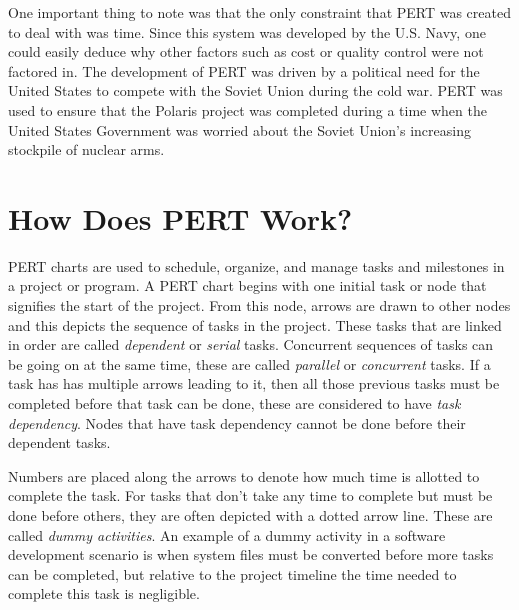 \documentclass[12pt]{article}
\begin{document}
One important thing to note was that the only constraint that PERT was created to deal with was time.
Since this system was developed by the U.S. Navy, one could easily deduce why other factors such as cost or quality control were not factored in.
The development of PERT was driven by a political need for the United States to compete with the Soviet Union during the cold war.
PERT was used to ensure that the Polaris project was completed during a time when the United States Government was worried about the Soviet Union's increasing stockpile of nuclear arms.
\section{How Does PERT Work?}
PERT charts are used to schedule, organize, and manage tasks and milestones in a project or program.
A PERT chart begins with one initial task or node that signifies the start of the project.
From this node, arrows are drawn to other nodes and this depicts the sequence of tasks in the project.  These tasks that are linked in order are called \textit{dependent} or \textit{serial} tasks.
Concurrent sequences of tasks can be going on at the same time, these are called \textit{parallel} or \textit{concurrent} tasks.
If a task has has multiple arrows leading to it, then all those previous tasks must be completed before that task can be done, these are considered to have \textit{task dependency}.  Nodes that have task dependency cannot be done before their dependent tasks.

Numbers are placed along the arrows to denote how much time is allotted to complete the task.
For tasks that don't take any time to complete but must be done before others, they are often depicted with a dotted arrow line.  These are called \textit{dummy activities}.
An example of a dummy activity in a software development scenario is when system files must be converted before more tasks can be completed, but relative to the project timeline the time needed to complete this task is negligible.
\end{document}
